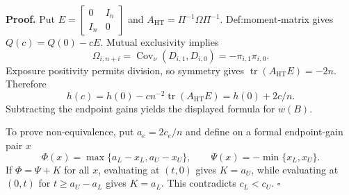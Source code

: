 \textbf{Proof.}
Put \(E=\begin{bmatrix}0&I_n\\I_n&0\end{bmatrix}\) and \(A_{\mathrm{HT}}=\Pi^{-1}\Omega\Pi^{-1}\).  Def:moment-matrix gives \(Q(c)=Q(0)-cE\).  Mutual exclusivity implies
\[
\Omega_{i,n+i}=\operatorname{Cov}_\nu(D_{i,1},D_{i,0})
=-\pi_{i,1}\pi_{i,0}.
\]
Exposure positivity permits division, so symmetry gives \(\operatorname{tr}(A_{\mathrm{HT}}E)=-2n\).  Therefore
\[
h(c)=h(0)-cn^{-2}\operatorname{tr}(A_{\mathrm{HT}}E)
=h(0)+2c/n.
\]
Subtracting the endpoint gains yields the displayed formula for \(w(B)\).

To prove non-equivalence, put \(a_e=2c_e/n\) and define on a formal endpoint-gain pair \(x\)
\[
\Phi(x)=\max\{a_L-x_L,a_U-x_U\},
\qquad \Psi(x)=-\min\{x_L,x_U\}.
\]
If \(\Phi=\Psi+K\) for all \(x\), evaluating at \((t,0)\) gives \(K=a_U\), while evaluating at \((0,t)\) for \(t\ge a_U-a_L\) gives \(K=a_L\).  This contradicts \(c_L<c_U\). \(\square\)